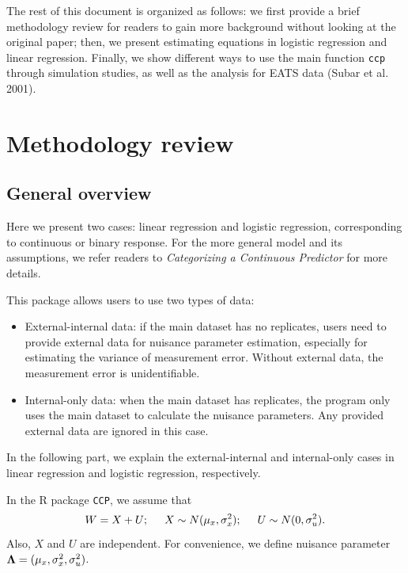 \documentclass[15 pt,]{article}
\begin{document}
The rest of this document is organized as follows: we first provide a
brief methodology review for readers to gain more background without
looking at the original paper; then, we present estimating equations in
logistic regression and linear regression. Finally, we show different
ways to use the main function \texttt{ccp} through simulation studies,
as well as the analysis for EATS data (Subar et al. 2001).

\section{Methodology review}\label{methodology-review}

\subsection{General overview}\label{general-overview}

Here we present two cases: linear regression and logistic regression,
corresponding to continuous or binary response. For the more general
model and its assumptions, we refer readers to \emph{Categorizing a
Continuous Predictor} for more details.

This package allows users to use two types of data:

\begin{itemize}
\item
  External-internal data: if the main dataset has no replicates, users
  need to provide external data for nuisance parameter estimation,
  especially for estimating the variance of measurement error. Without
  external data, the measurement error is unidentifiable.
\item
  Internal-only data: when the main dataset has replicates, the program
  only uses the main dataset to calculate the nuisance parameters. Any
  provided external data are ignored in this case.
\end{itemize}

In the following part, we explain the external-internal and
internal-only cases in linear regression and logistic regression,
respectively.

In the R package \texttt{CCP}, we assume that \[
                        W= X + U; \hskip 5mm
                        X \sim N(\mu_x,\sigma_x^2); \hskip 5mm
                        U \sim N(0,\sigma^2_u).
                    \] Also, \(X\) and \(U\) are independent. For
convenience, we define nuisance parameter
\(\mbox{\boldmath $\Lambda$} = (\mu_x, \sigma^2_x, \sigma^2_u)\).
\end{document}
